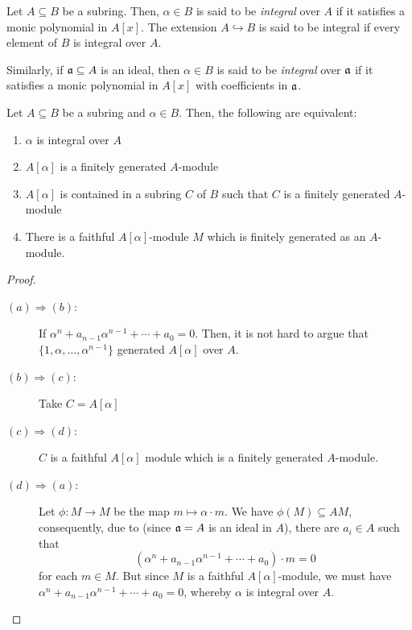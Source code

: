\begin{definition}
    Let $A\subseteq B$ be a subring. Then, $\alpha\in B$ is said to be \textit{integral} over $A$ if it satisfies a monic polynomial in $A[x]$. The extension $A\hookrightarrow B$ is said to be integral if every element of $B$ is integral over $A$.

    Similarly, if $\mathfrak a\subseteq A$ is an ideal, then $\alpha\in B$ is said to be \textit{integral} over $\mathfrak a$ if it satisfies a monic polynomial in $A[x]$ with coefficients in $\mathfrak a$.
\end{definition}

\begin{theorem}
    Let $A\subseteq B$ be a subring and $\alpha\in B$. Then, the following are equivalent: 
    \begin{enumerate}[label=(\alph*)]
        \item $\alpha$ is integral over $A$
        \item $A[\alpha]$ is a finitely generated $A$-module 
        \item $A[\alpha]$ is contained in a subring $C$ of $B$ such that $C$ is a finitely generated $A$-module 
        \item There is a faithful $A[\alpha]$-module $M$ which is finitely generated as an $A$-module.
    \end{enumerate}
\end{theorem}
\begin{proof}
\begin{description}
    \item[$(a)\Longrightarrow(b)$:] If $\alpha^n + a_{n - 1}\alpha^{n - 1} + \cdots + a_0 = 0$. Then, it is not hard to argue that $\{1,\alpha,\ldots,\alpha^{n - 1}\}$ generated $A[\alpha]$ over $A$.
    \item[$(b)\Longrightarrow(c)$:] Take $C = A[\alpha]$ 
    \item[$(c)\Longrightarrow(d)$:] $C$ is a faithful $A[\alpha]$ module which is a finitely generated $A$-module.
    \item[$(d)\Longrightarrow(a)$:] Let $\phi: M\to M$ be the map $m\mapsto\alpha\cdot m$. We have $\phi(M)\subseteq AM$, consequently, due to  (since $\mathfrak a = A$ is an ideal in $A$), there are $a_i\in A$ such that 
    \begin{equation*}
        (\alpha^n + a_{n - 1}\alpha^{n - 1} + \cdots + a_0)\cdot m = 0
    \end{equation*}
    for each $m\in M$. But since $M$ is a faithful $A[\alpha]$-module, we must have $\alpha^{n} + a_{n - 1}\alpha^{n - 1} + \cdots + a_0 = 0$, whereby $\alpha$ is integral over $A$.
\end{description}
\end{proof}

